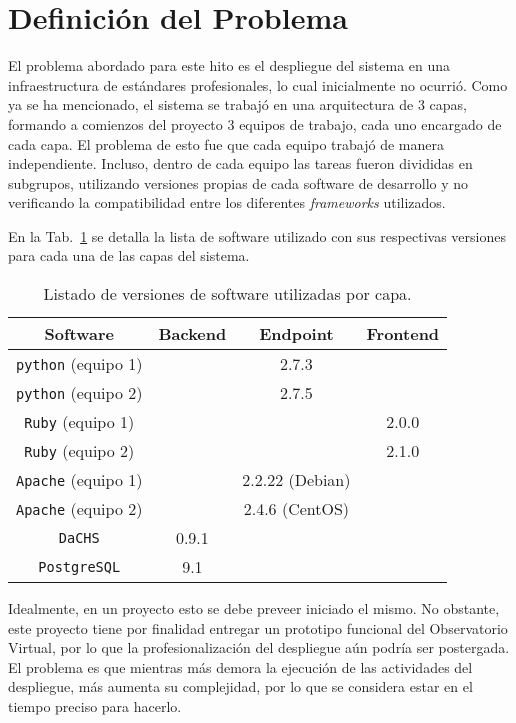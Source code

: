 \section{Definición del Problema}

El problema abordado para este hito es el despliegue del sistema en una infraestructura de estándares profesionales, lo cual inicialmente no ocurrió. Como ya se ha mencionado, el sistema se trabajó en una arquitectura de 3 capas, formando a comienzos del proyecto 3 equipos de trabajo, cada uno encargado de cada capa. El problema de esto fue que cada equipo trabajó de manera independiente. Incluso, dentro de cada equipo las tareas fueron divididas en subgrupos, utilizando versiones propias de cada software de desarrollo y no verificando la compatibilidad entre los diferentes \emph{frameworks} utilizados.

En la Tab.~\ref{tab:versiones} se detalla la lista de software utilizado con sus respectivas versiones para cada una de las capas del sistema.

\begin{table}[ht!]
	\begin{center}
		\begin{tabular}{c|c|c|c}
			Software & Backend & Endpoint & Frontend \\\hline\hline
			\texttt{python} (equipo 1) &  & 2.7.3 &   \\\hline
			\texttt{python} (equipo 2) &  & 2.7.5 &   \\\hline
			\texttt{Ruby} (equipo 1) &  &  & 2.0.0  \\\hline
			\texttt{Ruby} (equipo 2) &  &  & 2.1.0  \\\hline
			\texttt{Apache} (equipo 1) &  & 2.2.22 (Debian) &   \\\hline
			\texttt{Apache} (equipo 2) &  & 2.4.6 (CentOS) &   \\\hline
			\texttt{DaCHS} & 0.9.1 &  &   \\\hline
			\texttt{PostgreSQL} & 9.1 &  &   \\
		\end{tabular}
	\end{center}
	\caption{Listado de versiones de software utilizadas por capa.}\label{tab:versiones}
\end{table}

Idealmente, en un proyecto esto se debe preveer iniciado el mismo. No obstante, este proyecto tiene por finalidad entregar un prototipo funcional del Observatorio Virtual, por lo que la profesionalización del despliegue aún podría ser postergada. El problema es que mientras más demora la ejecución de las actividades del despliegue, más aumenta su complejidad, por lo que se considera estar en el tiempo preciso para hacerlo.


